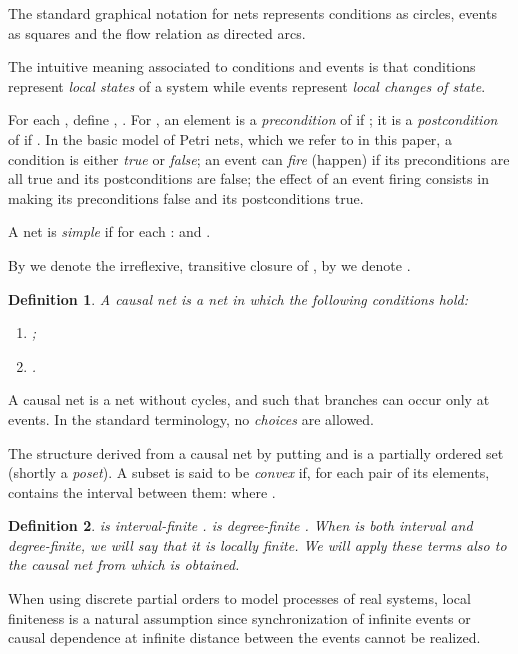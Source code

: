 \documentclass{eptcs}
\newtheorem{definition}{Definition}
\begin{document}
The standard graphical notation for nets represents conditions as
circles, events as squares and the flow relation as directed arcs.

The intuitive meaning associated to conditions and events is that
conditions represent \emph{local states} of a system while events
represent \emph{local changes of state}.

For each , define
  ,
  .
For , an element  is a \emph{precondition} of 
 if ; it is a \emph{postcondition} of 
if .
In the basic model of Petri nets, which we refer to in this
paper, a condition is either \emph{true} or \emph{false};
an event can \emph{fire} (happen) if its preconditions are
all true and its postconditions are false; the effect of
an event firing consists in making its preconditions false
and its postconditions true.

A net  is \emph{simple} if for each :
 and . 

By  we denote the irreflexive, transitive closure of ,
by  we denote .

\begin{definition}\label{d:causal_net}
A \emph{causal net} is a net in which the following conditions hold:
    \begin{enumerate}
      \item ;
      \item .
    \end{enumerate}
\end{definition}

A causal net is a net without cycles, and such that branches can occur
only at events. In the standard terminology, no \emph{choices} are
allowed.

The structure  derived from a causal net  
by putting  and  is a partially ordered
set (shortly a \emph{poset}). A subset  is
said to be \emph{convex} if, for each pair of its elements, 
contains the interval between them:
  where .

\begin{definition}\label{d:local_finiteness}
 is \emph{interval-finite}
.
 is \emph{degree-finite}
. When  is both interval and degree-finite, we will say that
it is \emph{locally finite}. We will apply these terms also to the causal
net from which  is obtained.\\
\end{definition}
When using discrete partial orders to model processes of
real systems, local finiteness is a natural
assumption since
synchronization of infinite events or
causal dependence at infinite distance between the events cannot be
realized.
\end{document}
